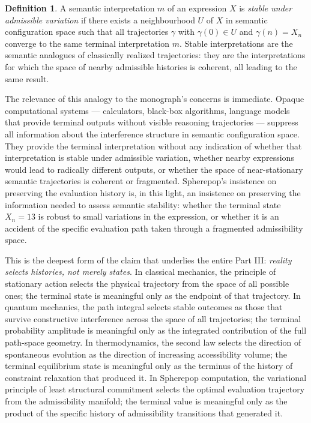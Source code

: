 \documentclass[12pt,openany]{book}
\theoremstyle{plain}
\theoremstyle{definition}
\newtheorem{definition}[theorem]{Definition}
\theoremstyle{remark}
\begin{document}
\begin{definition}
A semantic interpretation $m$ of an expression $X$ is \emph{stable under admissible variation} if there exists a neighbourhood $U$ of $X$ in semantic configuration space such that all trajectories $\gamma$ with $\gamma(0) \in U$ and $\gamma(n) = X_n$ converge to the same terminal interpretation $m$. Stable interpretations are the semantic analogues of classically realized trajectories: they are the interpretations for which the space of nearby admissible histories is coherent, all leading to the same result.
\end{definition}

The relevance of this analogy to the monograph's concerns is immediate. Opaque computational systems — calculators, black-box algorithms, language models that provide terminal outputs without visible reasoning trajectories — suppress all information about the interference structure in semantic configuration space. They provide the terminal interpretation without any indication of whether that interpretation is stable under admissible variation, whether nearby expressions would lead to radically different outputs, or whether the space of near-stationary semantic trajectories is coherent or fragmented. Spherepop's insistence on preserving the evaluation history is, in this light, an insistence on preserving the information needed to assess semantic stability: whether the terminal state $X_n = 13$ is robust to small variations in the expression, or whether it is an accident of the specific evaluation path taken through a fragmented admissibility space.

This is the deepest form of the claim that underlies the entire Part III: \emph{reality selects histories, not merely states}. In classical mechanics, the principle of stationary action selects the physical trajectory from the space of all possible ones; the terminal state is meaningful only as the endpoint of that trajectory. In quantum mechanics, the path integral selects stable outcomes as those that survive constructive interference across the space of all trajectories; the terminal probability amplitude is meaningful only as the integrated contribution of the full path-space geometry. In thermodynamics, the second law selects the direction of spontaneous evolution as the direction of increasing accessibility volume; the terminal equilibrium state is meaningful only as the terminus of the history of constraint relaxation that produced it. In Spherepop computation, the variational principle of least structural commitment selects the optimal evaluation trajectory from the admissibility manifold; the terminal value is meaningful only as the product of the specific history of admissibility transitions that generated it.
\end{document}
